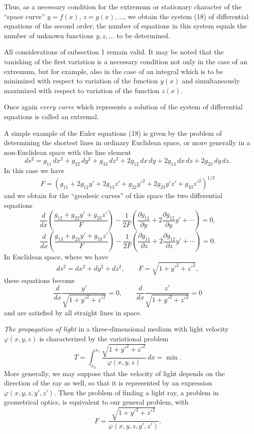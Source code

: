 Thus, as a necessary condition for the extremum or stationary character of the ``space curve'' $y=f(x)$, $z=g(x),\ldots$, we obtain the system (18) of differential equations of the second order; the number of equations in this system equals the number of unknown functions $y,z,\ldots$ to be determined.

All considerations of subsection 1 remain valid. It may be noted that the vanishing of the first variation is a necessary condition not only in the case of an extremum, but for example, also in the case of an integral which is to be minimized with respect to variation of the function $y(x)$ and simultaneously maximized with respect to variation of the function $z(x)$.

Once again \emph{every curve} which represents a solution of the system of differential equations is called an extremal.

A simple example of the Euler equations (18) is given by the problem of determining the shortest lines in ordinary Euclidean space, or more generally in a non-Euclidean space with the line element
\[
ds^2=g_{11}\,dx^2+g_{22}\,dy^2+g_{33}\,dz^2+2g_{12}\,dx\,dy+2g_{13}\,dx\,dz+2g_{23}\,dy\,dz.
\]
In this case we have
\[
F=(g_{11}+2g_{12}y'+2g_{13}z'+g_{22}y'^2+2g_{23}y'z'+g_{33}z'^2)^{1/2}
\]
and we obtain for the ``geodesic curves'' of this space the two differential equations
\[
\frac{d}{dx}\left(\frac{g_{12}+g_{22}y'+g_{23}z'}{F}\right)
-\frac{1}{2F}\left(\frac{\partial g_{11}}{\partial y}+2\frac{\partial g_{12}}{\partial y}y'+\cdots\right)=0,
\]
\[
\frac{d}{dx}\left(\frac{g_{13}+g_{23}y'+g_{33}z'}{F}\right)
-\frac{1}{2F}\left(\frac{\partial g_{11}}{\partial z}+2\frac{\partial g_{12}}{\partial z}y'+\cdots\right)=0.
\]
In Euclidean space, where we have
\[
ds^2=dx^2+dy^2+dz^2,\qquad F=\sqrt{1+y'^2+z'^2},
\]
these equations become
\[
\frac{d}{dx}\frac{y'}{\sqrt{1+y'^2+z'^2}}=0,\qquad
\frac{d}{dx}\frac{z'}{\sqrt{1+y'^2+z'^2}}=0
\]
and are satisfied by all straight lines in space.

\emph{The propagation of light} in a three-dimensional medium with light velocity $\varphi(x,y,z)$ is characterized by the variational problem
\[
T=\int_{x_0}^{x_1}\frac{\sqrt{1+y'^2+z'^2}}{\varphi(x,y,z)}\,dx=\min.
\]
More generally, we may suppose that the velocity of light depends on the direction of the ray as well, so that it is represented by an expression $\varphi(x,y,z,y',z')$. Then the problem of finding a light ray, a problem in geometrical optics, is equivalent to our general problem, with
\[
F=\frac{\sqrt{1+y'^2+z'^2}}{\varphi(x,y,z,y',z')}.
\]

